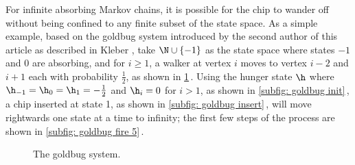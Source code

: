 \begin{remark}\label{remark: non-terminating infinite chip addition}
For infinite absorbing Markov chains,
it is possible for the chip to wander off
without being confined to any finite subset of the state space.
As a simple example, based on the goldbug system 
introduced by the second author of this article
as described in Kleber \cite{kleber2005goldbug}, 
take $\N\cup\{-1\}$ as the state space 
where states $-1$ and 0 are absorbing, and for $i \geq 1$, 
a walker at vertex $i$ 
moves to vertex $i-2$ and $i+1$ each with probability $\frac{1}{2}$, 
as shown in \cref{fig: goldbug system}\,.
Using the hunger state $\h$ where $\h_{-1} = \h_0 = \h_1 = -\frac{1}{2}$ 
and $\h_i = 0$ for $i > 1$, as shown in \cref{subfig: goldbug init}\,,
a chip inserted at state 1, as shown in \cref{subfig: goldbug insert}\,,
will move rightwards one state at a time to infinity;
the first few steps of the process 
are shown in \cref{subfig: goldbug fire 5}\,.
\begin{figure}[htbp]
    \centering
    \caption{The goldbug system.}
    \label{fig: goldbug system}
\end{figure}



\end{remark}

